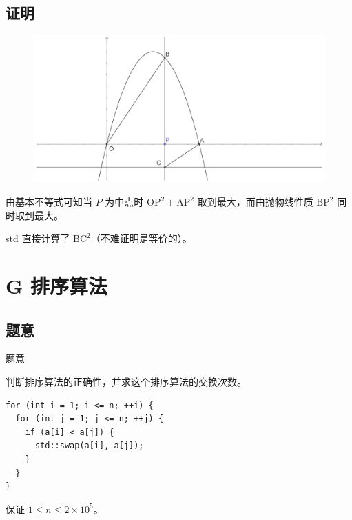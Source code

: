 \documentclass[11pt, fontset = fandol]{ctexbeamer}
\begin{document}
\subsection{证明}
\begin{frame}
  \pause

  \begin{figure}[H]
    \centering
    \includegraphics[scale=0.08]{pic.pdf}
  \end{figure}

  \pause

  由基本不等式可知当 $P$ 为中点时 $\mathrm{OP}^2 + \mathrm{AP}^2$ 取到最大，而由抛物线性质 $\mathrm{BP}^2$ 同时取到最大。

  std 直接计算了 $\mathrm{BC}^2$（不难证明是等价的）。

\end{frame}

\section{G 排序算法}
\subsection{题意}
\begin{frame}[fragile]
  \begin{block}{题意}

    判断排序算法的正确性，并求这个排序算法的交换次数。

    \begin{lstlisting}
for (int i = 1; i <= n; ++i) {
  for (int j = 1; j <= n; ++j) {
    if (a[i] < a[j]) {
      std::swap(a[i], a[j]);
    }
  }
}
    \end{lstlisting}

    保证 $1 \le n \le 2 \times {10}^5$。
  \end{block}
\end{frame}
\end{document}
